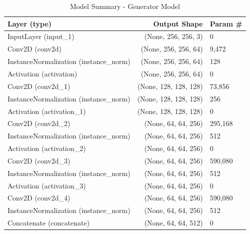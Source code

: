 \documentclass[12pt,DIV14,BCOR12mm,a4paper,footinclude=false,headinclude,parskip=half-,twoside,openright,cleardoublepage=empty,toc=index,bibliography=totoc,listof=totoc]{scrreprt}
\numberwithin{equation}{chapter}
\begin{document}
\begin{longtable}{lrl}
    \caption{Model Summary - Generator Model} \\
    \toprule
    \textbf{Layer (type)}  & \textbf{Output Shape} & \textbf{Param \#} \\
    \midrule
    \endfirsthead

    \endhead

    
    \endfoot

    \bottomrule
    \endlastfoot
		InputLayer (input\_1)                 & (None, 256, 256, 3)         & 0                \\ 
		Conv2D (conv2d)                       & (None, 256, 256, 64)        & 9,472            \\ 
		InstanceNormalization (instance\_norm) & (None, 256, 256, 64)        & 128              \\ 
		Activation (activation)                & (None, 256, 256, 64)        & 0                \\ 
		Conv2D (conv2d\_1)                   & (None, 128, 128, 128)       & 73,856           \\ 
		InstanceNormalization (instance\_norm) & (None, 128, 128, 128)       & 256              \\
		Activation (activation\_1)            & (None, 128, 128, 128)       & 0                \\
		Conv2D (conv2d\_2)                   & (None, 64, 64, 256)         & 295,168          \\
		InstanceNormalization (instance\_norm) & (None, 64, 64, 256)         & 512              \\
		Activation (activation\_2)            & (None, 64, 64, 256)         & 0                \\
		Conv2D (conv2d\_3)                   & (None, 64, 64, 256)         & 590,080          \\
		InstanceNormalization (instance\_norm) & (None, 64, 64, 256)         & 512              \\
		Activation (activation\_3)            & (None, 64, 64, 256)         & 0                \\
		Conv2D (conv2d\_4)                   & (None, 64, 64, 256)         & 590,080          \\ 
		InstanceNormalization (instance\_norm) & (None, 64, 64, 256)         & 512              \\
		Concatenate (concatenate)             & (None, 64, 64, 512)         & 0                \\

\end{longtable}
\end{document}
